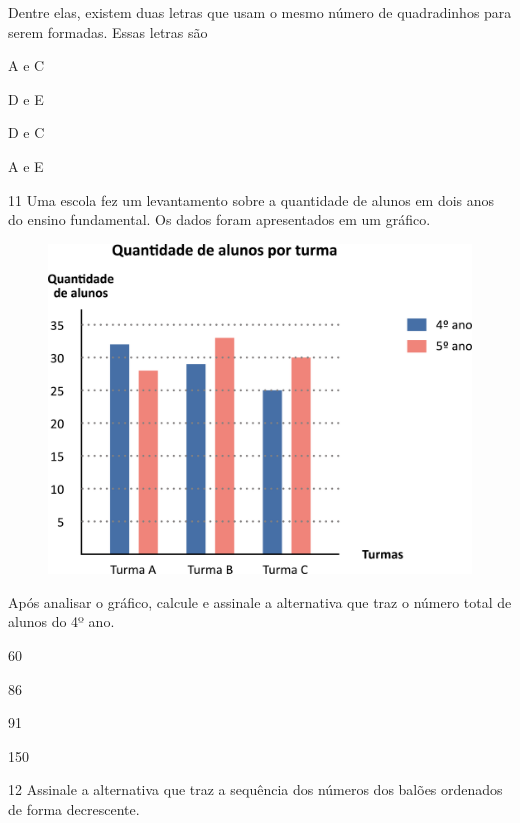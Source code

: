 Dentre elas, existem duas letras que usam o mesmo número de quadradinhos para serem formadas. Essas letras são

\begin{escolha}
\item
  A e C
\item
  D e E
\item
  D e C
\item
  A e E
\end{escolha}

\num{11} Uma escola fez um levantamento sobre a quantidade de alunos em dois anos
do ensino fundamental. Os dados foram apresentados em um gráfico.

\begin{figure}[htpb!]
\centering
\includegraphics[width=\textwidth]{./media/image97.png}
\end{figure}

Após analisar o gráfico, calcule e assinale a alternativa que traz o número total de alunos do 4º ano.

\begin{escolha}
\item
  60
\item
  86
\item
  91
\item
  150
\end{escolha}

\pagebreak

\num{12} Assinale a alternativa que traz a sequência dos números dos balões ordenados de forma decrescente.

